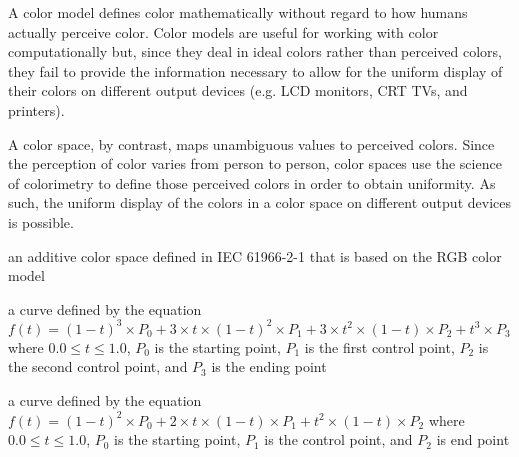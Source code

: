 A color model defines color mathematically without regard to how humans actually perceive color. Color models are useful for working with color computationally but, since they deal in ideal colors rather than perceived colors, they fail to provide the information necessary to allow for the uniform display of their colors on different output devices (e.g. LCD monitors, CRT TVs, and printers).

A color space, by contrast, maps unambiguous values to perceived colors. Since the perception of color varies from person to person, color spaces use the science of colorimetry to define those perceived colors in order to obtain uniformity. As such, the uniform display of the colors in a color space on different output devices is possible.
\exitnote

an additive color space defined in IEC 61966-2-1 that is based on the RGB color model

%
%
a curve defined by the 
equation $f(t) = (1 - t)^{3} \times P_{0} + 3 \times t \times (1 - t)^{2} 
\times P_{1} + 3 \times t^{2} \times (1 - t) \times P_{2} + t^{3} \times P_{3}$ 
where $0.0 \le t \le 1.0$, $P_{0}$ is the starting point, $P_{1}$ is the first 
control point, $P_{2}$ is the second control point, and $P_{3}$ is the 
ending point

a curve defined by the 
equation $f(t) = (1 - t)^{2} \times P_{0} + 2 \times t \times (1 - t) 
\times P_{1} + t^{2} \times (1 - t) \times P_{2}$ 
where $0.0 \le t \le 1.0$, $P_{0}$ is the starting point, $P_{1}$ is the 
control point, and $P_{2}$ is end point


